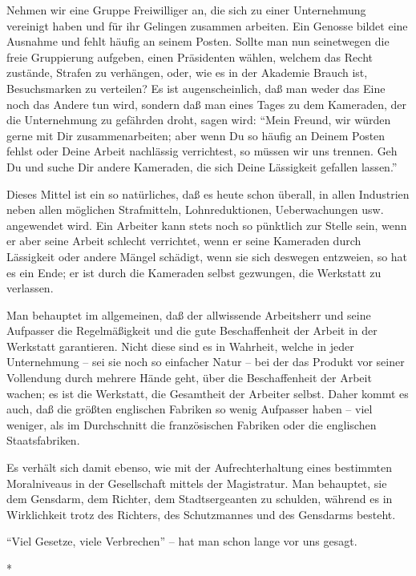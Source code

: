 \documentclass{scrbook}
\begin{document}
Nehmen wir eine Gruppe Freiwilliger an, die sich zu einer Unternehmung vereinigt haben und für ihr Gelingen zusammen arbeiten. Ein Genosse bildet eine Ausnahme und fehlt häufig an seinem Posten. Sollte man nun seinetwegen die freie Gruppierung aufgeben, einen Präsidenten wählen, welchem das Recht zustände, Strafen zu verhängen, oder, wie es in der Akademie Brauch ist, Besuchsmarken zu verteilen? Es ist augenscheinlich, daß man weder das Eine noch das Andere tun wird, sondern daß man eines Tages zu dem Kameraden, der die Unternehmung zu gefährden droht, sagen wird: ``Mein Freund, wir würden gerne mit Dir zusammenarbeiten; aber wenn Du so häufig an Deinem Posten fehlst oder Deine Arbeit nachlässig verrichtest, so müssen wir uns trennen. Geh Du und suche Dir andere Kameraden, die sich Deine Lässigkeit gefallen lassen.''

Dieses Mittel ist ein so natürliches, daß es heute schon überall, in allen Industrien neben allen möglichen Strafmitteln, Lohnreduktionen, Ueberwachungen usw. angewendet wird. Ein Arbeiter kann stets noch so pünktlich zur Stelle sein, wenn er aber seine Arbeit schlecht verrichtet, wenn er seine Kameraden durch Lässigkeit oder andere Mängel schädigt, wenn sie sich deswegen entzweien, so hat es ein Ende; er ist durch die Kameraden selbst gezwungen, die Werkstatt zu verlassen.

Man behauptet im allgemeinen, daß der allwissende Arbeitsherr und seine Aufpasser die Regelmäßigkeit und die gute Beschaffenheit der Arbeit in der Werkstatt garantieren. Nicht diese sind es in Wahrheit, welche in jeder Unternehmung – sei sie noch so einfacher Natur – bei der das Produkt vor seiner Vollendung durch mehrere Hände geht, über die Beschaffenheit der Arbeit wachen; es ist die Werkstatt, die Gesamtheit der Arbeiter selbst. Daher kommt es auch, daß die größten englischen Fabriken so wenig Aufpasser haben – viel weniger, als im Durchschnitt die französischen Fabriken oder die englischen Staatsfabriken.

Es verhält sich damit ebenso, wie mit der Aufrechterhaltung eines bestimmten Moralniveaus in der Gesellschaft mittels der Magistratur. Man behauptet, sie dem Gensdarm, dem Richter, dem Stadtsergeanten zu schulden, während es in Wirklichkeit trotz des Richters, des Schutzmannes und des Gensdarms besteht.

``Viel Gesetze, viele Verbrechen'' – hat man schon lange vor uns gesagt.

\begin{center}*\end{center}
\end{document}
